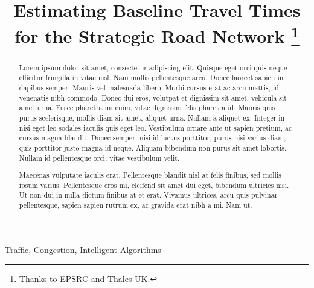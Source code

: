 \documentclass[conference]{IEEEtran}
\begin{document}
\title{Estimating Baseline Travel Times for the Strategic Road Network
\thanks{Thanks to EPSRC and Thales UK.}
}

\author{
\and
{}
\and
{}
}

\maketitle

\begin{abstract}
Lorem ipsum dolor sit amet, consectetur adipiscing elit. Quisque eget orci quis neque efficitur fringilla in vitae nisl. Nam mollis pellentesque arcu. Donec laoreet sapien in dapibus semper. Mauris vel malesuada libero. Morbi cursus erat ac arcu mattis, id venenatis nibh commodo. Donec dui eros, volutpat et dignissim sit amet, vehicula sit amet urna. Fusce pharetra mi enim, vitae dignissim felis pharetra id. Mauris quis purus scelerisque, mollis diam sit amet, aliquet urna. Nullam a aliquet ex. Integer in nisi eget leo sodales iaculis quis eget leo. Vestibulum ornare ante ut sapien pretium, ac cursus magna blandit. Donec semper, nisi id luctus porttitor, purus nisi varius diam, quis porttitor justo magna id neque. Aliquam bibendum non purus sit amet lobortis. Nullam id pellentesque orci, vitae vestibulum velit.

Maecenas vulputate iaculis erat. Pellentesque blandit nisl at felis finibus, sed mollis ipsum varius. Pellentesque eros mi, eleifend sit amet dui eget, bibendum ultricies nisi. Ut non dui in nulla dictum finibus at et erat. Vivamus ultrices, arcu quis pulvinar pellentesque, sapien sapien rutrum ex, ac gravida erat nibh a mi. Nam ut.
\end{abstract}

\begin{IEEEkeywords}
Traffic, Congestion, Intelligent Algorithms
\end{IEEEkeywords}
\end{document}
